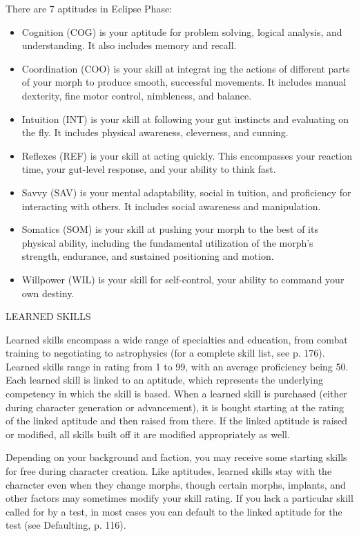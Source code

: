There are 7 aptitudes in Eclipse Phase:

\begin{itemize}
\item Cognition (COG) is your aptitude for problem solving, logical
  analysis, and understanding. It also includes memory and recall.
\item Coordination (COO) is your skill at integrat ing the actions of
  different parts of your morph to produce smooth, successful
  movements. It includes manual dexterity, fine motor control,
  nimbleness, and balance.
\item Intuition (INT) is your skill at following your gut instincts
  and evaluating on the fly. It includes physical awareness,
  cleverness, and cunning.
\item Reflexes (REF) is your skill at acting quickly. This encompasses
  your reaction time, your gut-level response, and your ability to
  think fast.
\item Savvy (SAV) is your mental adaptability, social in tuition, and
  proficiency for interacting with others.  It includes social
  awareness and manipulation.
\item Somatics (SOM) is your skill at pushing your morph to the best
  of its physical ability, including the fundamental utilization of
  the morph's strength, endurance, and sustained positioning and
  motion.
\item Willpower (WIL) is your skill for self-control, your ability to
  command your own destiny.
\end{itemize}

LEARNED SKILLS

Learned skills encompass a wide range of specialties
and education, from combat training to negotiating
to astrophysics (for a complete skill list, see p. 176).
Learned skills range in rating from 1 to 99, with an
average proficiency being 50. Each learned skill is
linked to an aptitude, which represents the underlying
competency in which the skill is based. When a learned
skill is purchased (either during character generation
or advancement), it is bought starting at the rating of
the linked aptitude and then raised from there. If the
linked aptitude is raised or modified, all skills built off
it are modified appropriately as well.

Depending on your background and faction, you
may receive some starting skills for free during
character creation. Like aptitudes, learned skills stay
with the character even when they change morphs,
though certain morphs, implants, and other factors
may sometimes modify your skill rating. If you lack
a particular skill called for by a test, in most cases
you can default to the linked aptitude for the test (see
Defaulting, p. 116).

